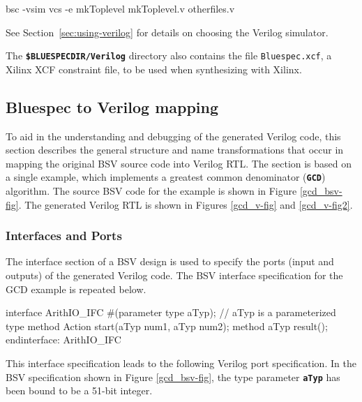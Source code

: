 \documentclass{article}
\newcommand{\te}[1]{\texttt{#1}}
\newenvironment{centerboxverbatim}
  {\center
   \boxedverbatim}
  {\endboxedverbatim
  {\endcenter }}
\begin{document}
\begin{centerboxverbatim}
bsc -vsim vcs -e mkToplevel mkToplevel.v otherfiles.v
\end{centerboxverbatim}

See Section~\ref{sec:using-verilog} for details on choosing the Verilog
simulator.


The {\bf\tt \$BLUESPECDIR/Verilog}  directory also contains the file
\te{Bluespec.xcf},   a Xilinx XCF
constraint file,  to be used when synthesizing with Xilinx. 



\subsection{Bluespec to Verilog mapping}
\label{sec-vl-name-mapping}

To aid in the understanding and debugging of the generated Verilog
code, this section describes the general structure and name
transformations that occur in mapping the original BSV source code
into Verilog RTL.  The section is based on a single example, which
implements a greatest common denominator ({\bf\tt GCD}) algorithm.  The
source BSV code for the example is shown in Figure \ref{gcd_bsv-fig}.
The generated Verilog RTL is shown in Figures \ref{gcd_v-fig} and
\ref{gcd_v-fig2}.


\subsubsection{Interfaces and Ports}
The interface section of a BSV design is used to specify the ports
(input and outputs) of the generated Verilog code.  The BSV interface
specification for the GCD example is repeated below.


\begin{centerboxverbatim}
interface ArithIO_IFC #(parameter type aTyp); // aTyp is a parameterized type
    method Action start(aTyp num1, aTyp num2);
    method aTyp result();
endinterface: ArithIO_IFC
\end{centerboxverbatim}


This interface specification leads to the following Verilog port
specification.  In the BSV specification shown in Figure
\ref{gcd_bsv-fig}, the type parameter {\bf\tt aTyp} has been bound to be a
51-bit integer.
\end{document}
